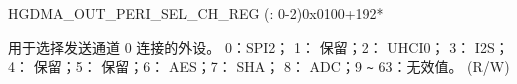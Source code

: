 \begin{register}{H}{GDMA\_OUT\_PERI\_SEL\_CH\_REG (: 0-2)}{0x0100+192*}\label{regdesc:GDMAOUTPERISELCHNREG}
%
%
\regnewline%
\begin{regdesc}\begin{reglist}
\label{fielddesc:GDMAPERIOUTSELCHN}\item [GDMA\_PERI\_OUT\_SEL\_CH\regindex{n}] 用于选择发送通道 0 连接的外设。 0：SPI2； 1： 保留；2： UHCI0； 3： I2S；   4： 保留；5： 保留；6： AES；7： SHA； 8： ADC；9 \verb+~+ 63：无效值。 (R/W)
\end{reglist}\end{regdesc}
\end{register}
